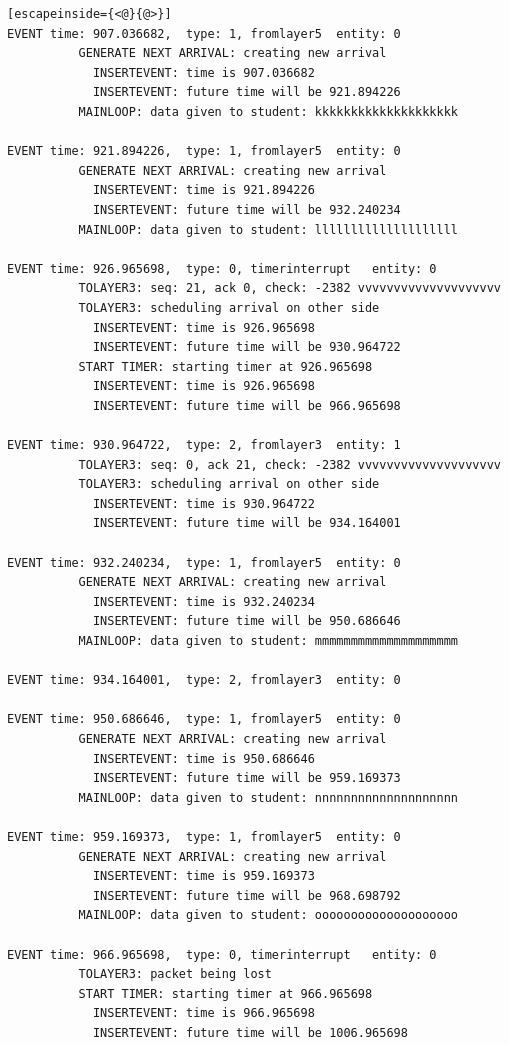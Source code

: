 \documentclass[paper=a4, fontsize=11pt]{scrartcl}
\numberwithin{equation}{section}		%
\numberwithin{figure}{section}			%
\numberwithin{table}{section}				%
\begin{document}
\begin{lstlisting}[escapeinside={<@}{@>}]
EVENT time: 907.036682,  type: 1, fromlayer5  entity: 0
          GENERATE NEXT ARRIVAL: creating new arrival
            INSERTEVENT: time is 907.036682
            INSERTEVENT: future time will be 921.894226
          MAINLOOP: data given to student: kkkkkkkkkkkkkkkkkkkk

EVENT time: 921.894226,  type: 1, fromlayer5  entity: 0
          GENERATE NEXT ARRIVAL: creating new arrival
            INSERTEVENT: time is 921.894226
            INSERTEVENT: future time will be 932.240234
          MAINLOOP: data given to student: llllllllllllllllllll

EVENT time: 926.965698,  type: 0, timerinterrupt   entity: 0
          TOLAYER3: seq: 21, ack 0, check: -2382 vvvvvvvvvvvvvvvvvvvv
          TOLAYER3: scheduling arrival on other side
            INSERTEVENT: time is 926.965698
            INSERTEVENT: future time will be 930.964722
          START TIMER: starting timer at 926.965698
            INSERTEVENT: time is 926.965698
            INSERTEVENT: future time will be 966.965698

EVENT time: 930.964722,  type: 2, fromlayer3  entity: 1
          TOLAYER3: seq: 0, ack 21, check: -2382 vvvvvvvvvvvvvvvvvvvv
          TOLAYER3: scheduling arrival on other side
            INSERTEVENT: time is 930.964722
            INSERTEVENT: future time will be 934.164001

EVENT time: 932.240234,  type: 1, fromlayer5  entity: 0
          GENERATE NEXT ARRIVAL: creating new arrival
            INSERTEVENT: time is 932.240234
            INSERTEVENT: future time will be 950.686646
          MAINLOOP: data given to student: mmmmmmmmmmmmmmmmmmmm

EVENT time: 934.164001,  type: 2, fromlayer3  entity: 0

EVENT time: 950.686646,  type: 1, fromlayer5  entity: 0
          GENERATE NEXT ARRIVAL: creating new arrival
            INSERTEVENT: time is 950.686646
            INSERTEVENT: future time will be 959.169373
          MAINLOOP: data given to student: nnnnnnnnnnnnnnnnnnnn

EVENT time: 959.169373,  type: 1, fromlayer5  entity: 0
          GENERATE NEXT ARRIVAL: creating new arrival
            INSERTEVENT: time is 959.169373
            INSERTEVENT: future time will be 968.698792
          MAINLOOP: data given to student: oooooooooooooooooooo

EVENT time: 966.965698,  type: 0, timerinterrupt   entity: 0
          TOLAYER3: packet being lost
          START TIMER: starting timer at 966.965698
            INSERTEVENT: time is 966.965698
            INSERTEVENT: future time will be 1006.965698


\end{lstlisting}
\end{document}
